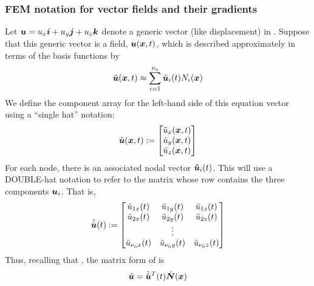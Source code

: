 \subsubsection{FEM notation for vector fields and their gradients}
Let $\bm{u}=u_x \bm{i} + u_y \bm{j} + u_z \bm{k}$ denote a generic vector (like displacement) in \threeD.  Suppose that this generic vector is a field, $\bm{u}(\bm{x},{t})$, which is described approximately in terms of the basis functions by
\begin{equation}
  \tilde{\bm{u}}(\bm{x},{t})\approx\sum\limits_{i=1}^{{\nu_\text{n}}} \tilde{\bm{u}}_i({t}) {N}_i(\bm{x})
\label{eq:vecfieldOnGridc}
\end{equation}
%
We define the \threeD component array for the left-hand side of this equation vector using a ``single hat'' notation:
\begin{equation}
  \hat{\bm{u}}(\bm{x},{t}):=\begin{bmatrix}
                               \tilde{u}_x(\bm{x},{t}) \\ 
                               \tilde{u}_y(\bm{x},{t}) \\ 
                               \tilde{u}_z(\bm{x},{t})
                        \end{bmatrix}
\end{equation}
For each node, there is an associated nodal vector $\bm{\tilde{u}}_i({t})$.  This \manuscript will use a DOUBLE-hat notation to refer to the \numnodes{} matrix whose \ith row contains the three components $\bm{u}_i$. That is,
\begin{equation}
  \hat{\hat{\bm{u}}}({t}):=
\begin{bmatrix}
\tilde{u}_{1x}({t}) & \tilde{u}_{1y}({t}) &  \tilde{u}_{1z}({t}) \\
\tilde{u}_{2x}({t}) & \tilde{u}_{2y}({t}) &  \tilde{u}_{2z}({t}) \\
              &     \vdots    &                \\
\tilde{u}_{{\nu_\text{n}} x}({t}) & \tilde{u}_{{\nu_\text{n}} y}({t}) &  \tilde{u}_{{\nu_\text{n}} z}({t})
\end{bmatrix}
\end{equation}
Thus, recalling that , the matrix form of  is
\begin{equation}
  \hat{\bm{u}}=\hat{\hat{\bm{u}}}^T({t})\hat{\bm{N}}(\bm{x})
\end{equation}


